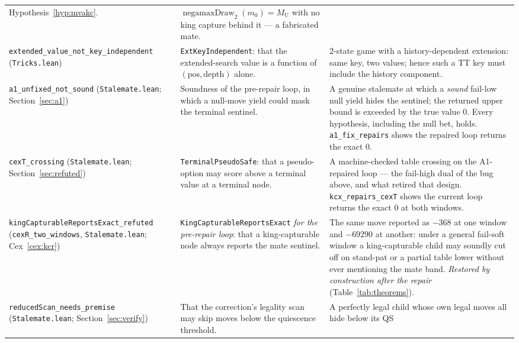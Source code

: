 \documentclass[11pt]{article}
\DeclareMathOperator{\negamaxD}{negamaxDraw}
\newcommand{\MU}{M_{\mathrm{U}}}    %
\theoremstyle{plain}
\theoremstyle{definition}
\theoremstyle{remark}
\begin{document}
{\begin{longtable}{@{}p{4.4cm}p{4.2cm}p{5.9cm}@{}}
Hypothesis~\ref{hyp:mvakc}. &
$\negamaxD_2(m_0) = \MU$ with no king capture behind it --- a fabricated
mate.\\
\addlinespace
\texttt{extended\_value\_not\_key\_independent} \newline (\texttt{Tricks.lean}) &
\texttt{ExtKeyIndependent}: that the extended-search value is a function
of $(\mathrm{pos}, \mathrm{depth})$ alone. &
2-state game with a history-dependent extension: same key, two values;
hence such a TT key must include the history component.\\
\addlinespace
\texttt{a1\_unfixed\_not\_sound} \newline (\texttt{Stalemate.lean};
Section~\ref{sec:a1}) &
Soundness of the pre-repair loop, in which a null-move yield could mask
the terminal sentinel. &
A genuine stalemate at which a \emph{sound} fail-low null yield hides
the sentinel; the returned upper bound is exceeded by the true value
$0$.  Every hypothesis, including the null bet, holds.
\texttt{a1\_fix\_repairs} shows the repaired loop returns the exact
$0$.\\
\addlinespace
\texttt{cexT\_crossing} \newline (\texttt{Stalemate.lean};
Section~\ref{sec:refuted}) &
\texttt{TerminalPseudoSafe}: that a pseudo-option may score above a
terminal value at a terminal node. &
A machine-checked table crossing on the A1-repaired loop --- the
fail-high dual of the bug above, and what retired that design.
\texttt{kcx\_repairs\_cexT} shows the current loop returns the exact
$0$ at both windows.\\
\addlinespace
\texttt{kingCapturableReportsExact\_refuted} \newline
(\texttt{cexR\_two\_windows}, \texttt{Stalemate.lean};
Cex~\ref{cex:kcr}) &
\texttt{KingCapturableReportsExact} \emph{for the pre-repair loop}:
that a king-capturable node always reports the mate sentinel. &
The same move reported as $-368$ at one window and $-69290$ at another:
under a general fail-soft window a king-capturable child may soundly
cut off on stand-pat or a partial table lower without ever mentioning
the mate band.  \emph{Restored by construction after the repair}
(Table~\ref{tab:theorems}).\\
\addlinespace
\texttt{reducedScan\_needs\_premise} \newline (\texttt{Stalemate.lean};
Section~\ref{sec:verify}) &
That the correction's legality scan may skip moves below the
quiescence threshold. &
A perfectly legal child whose own legal moves all hide below its QS

\end{longtable}}
\end{document}

